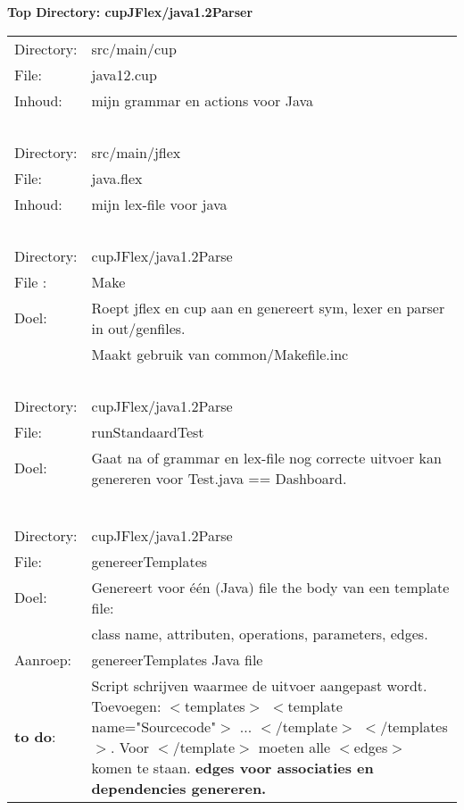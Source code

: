 \documentclass[12pt,a4paper]{report}
\begin{document}
	\begin{center}
		\textbf{Top Directory: cupJFlex/java1.2Parser}
	\end{center}

\begin{flushleft}
\begin{tabular} {l p{12cm}}
Directory: & src/main/cup \\
File:      & java12.cup \\   
Inhoud:    & mijn grammar en actions voor Java \\
\ \\
Directory: & src/main/jflex  \\
File:      & java.flex  \\  
Inhoud:    & mijn lex-file voor java \\
\ \\
Directory: & cupJFlex/java1.2Parse \\
File :     & Make \\
Doel:      & Roept jflex en cup aan en genereert sym, lexer en parser in out/genfiles. \\
           & Maakt gebruik van common/Makefile.inc \\
\ \\
Directory: & cupJFlex/java1.2Parse \\
File:      & runStandaardTest  \\  
Doel:      & Gaat na of grammar en lex-file nog correcte uitvoer kan genereren voor 
             Test.java == Dashboard. \\
           & \\
\ \\
Directory: & cupJFlex/java1.2Parse \\
File:      & genereerTemplates  \\  
Doel:      & Genereert voor \'e\'en (Java) file the body van een template file: \\
		   & class name, attributen, operations, parameters, edges. \\
Aanroep:   & genereerTemplates Java file \\
\textbf{to do}:   & Script schrijven waarmee de uitvoer aangepast wordt. \newline
                    Toevoegen: $<$templates$>$ $<$template name="Sourcecode"$>$ ... $<$/template$>$ $<$/templates$>$. \newline
                    Voor $<$/template$>$ moeten alle $<$edges$>$ komen te staan. \newline
                    \textbf{edges voor associaties en dependencies genereren.}

\end{tabular}
\end{flushleft}
\end{document}
